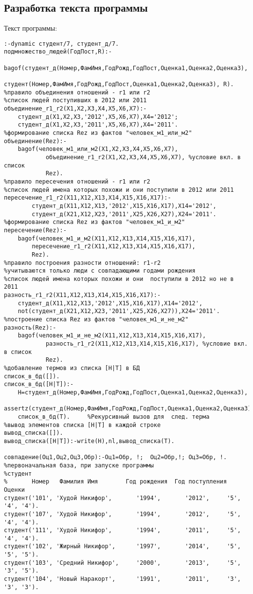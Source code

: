 \documentclass[a4paper,14pt]{extarticle}
\begin{document}
\subsection{Разработка текста программы}
Текст программы:
\begin{lstlisting}
:-dynamic студент/7, студент_д/7.
подмножество_людей(ГодПост,R):-
    bagof(студент_д(Номер,ФамИмя,ГодРожд,ГодПост,Оценка1,Оценка2,Оценка3),
            студент(Номер,ФамИмя,ГодРожд,ГодПост,Оценка1,Оценка2,Оценка3), R).
%правило объединения отношений - r1 или r2
%список людей поступивших в 2012 или 2011
объединение_r1_r2(X1,X2,X3,X4,X5,X6,X7):-
    студент_д(X1,X2,X3,'2012',X5,X6,X7),X4='2012';
    студент_д(X1,X2,X3,'2011',X5,X6,X7),X4='2011'.
%формирование списка Rez из фактов "человек_м1_или_м2"
объединение(Rez):-
    bagof(человек_м1_или_м2(X1,X2,X3,X4,X5,X6,X7),
            объединение_r1_r2(X1,X2,X3,X4,X5,X6,X7), %условие вкл. в список
            Rez).
%правило пересечения отношений - r1 или r2
%список людей имена которых похожи и они поступили в 2012 или 2011
пересечение_r1_r2(X11,X12,X13,X14,X15,X16,X17):-
        студент_д(X11,X12,X13,'2012',X15,X16,X17),X14='2012',
        студент_д(X21,X12,X23,'2011',X25,X26,X27),X24='2011'.
%формирование списка Rez из фактов "человек_м1_и_м2"
пересечение(Rez):-
    bagof(человек_м1_и_м2(X11,X12,X13,X14,X15,X16,X17),
        пересечение_r1_r2(X11,X12,X13,X14,X15,X16,X17),
        Rez).
%правило построения разности отношений: r1-r2
%учитываются только люди с совпадающими годами рождения
%список людей имена которых похожи и они  поступили в 2012 но не в 2011
разность_r1_r2(X11,X12,X13,X14,X15,X16,X17):-
    студент_д(X11,X12,X13,'2012',X15,X16,X17),X14='2012',
    not(студент_д(X21,X12,X23,'2011',X25,X26,X27)),X24='2011'.
%построение списка Rez из фактов "человек_м1_и_не_м2"
разность(Rez):-
    bagof(человек_м1_и_не_м2(X11,X12,X13,X14,X15,X16,X17),
            разность_r1_r2(X11,X12,X13,X14,X15,X16,X17), %условие вкл. в список
            Rez).
%добавление термов из списка [H|T] в БД
список_в_бд([]).
список_в_бд([H|T]):-
    H=студент_д(Номер,ФамИмя,ГодРожд,ГодПост,Оценка1,Оценка2,Оценка3),
    assertz(студент_д(Номер,ФамИмя,ГодРожд,ГодПост,Оценка1,Оценка2,Оценка3)),
    список_в_бд(T).     %Рекурсивный вызов для  след. терма
%вывод элементов списка [H|T] в каждой строке
вывод_списка([]).
вывод_списка([H|T]):-write(H),nl,вывод_списка(T).

совпадение(Оц1,Оц2,Оц3,Обр):-Оц1=Обр, !;  Оц2=Обр,!; Оц3=Обр, !.
%первоначальная база, при запуске программы
%студент
%       Номер   Фамилия Имя        Год рождения  Год поступления    Оценки
студент('101', 'Худой Никифор',       '1994',       '2012',     '5', '4', '4').
студент('107', 'Худой Никифор',       '1994',       '2012',     '5', '4', '4').
студент('111', 'Худой Никифор',       '1994',       '2011',     '5', '4', '4').
студент('102', 'Жирный Никифор',      '1997',       '2014',     '5', '5', '5').
студент('103', 'Средний Никифор',     '2000',       '2013',     '5', '3', '5').
студент('104', 'Новый Наракорт',      '1991',       '2011',     '3', '3', '3').


\end{lstlisting}
\end{document}
